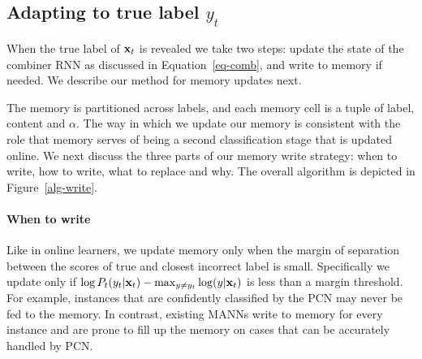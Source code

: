 \documentclass[letterpaper]{article} %
\newcommand{\vek}[1]{{\bf {#1}}}
\newcommand{\vx}{{\vek{x}}}
\def\shiv#1{\todo [color=orange]{Shiv: #1}}
\begin{document}
\subsection{Adapting to true label $y_t$}
When the true label of $\vx_t$ is revealed we take two steps: update the state of the combiner RNN as discussed in Equation~\ref{eq-comb}, and write to memory if needed.  We describe our method for memory updates next. 

The memory is partitioned across labels, and each memory cell is a tuple of label, content and $\alpha$.  %
The way in which we update our memory is consistent with the role that memory serves of being a second classification stage that is updated online.  We next discuss the three parts of our memory write strategy: when to write, how to write, what to replace and why. The overall algorithm is depicted in Figure~\ref{alg-write}.
%
\paragraph{When to write}
Like in online learners, we update memory only when the margin of separation between the scores of true and closest incorrect label is small. Specifically we update only if $\log P_t(y_t|\vx_t) - \max_{y \ne y_t} \log (y | \vx_t)$ is less than a margin threshold.  For example, instances that are confidently classified by the PCN may never be fed to the memory.     
In contrast,  existing MANNs write to memory for every instance and are prone to fill up the memory on cases that can be accurately handled by PCN.
\end{document}
